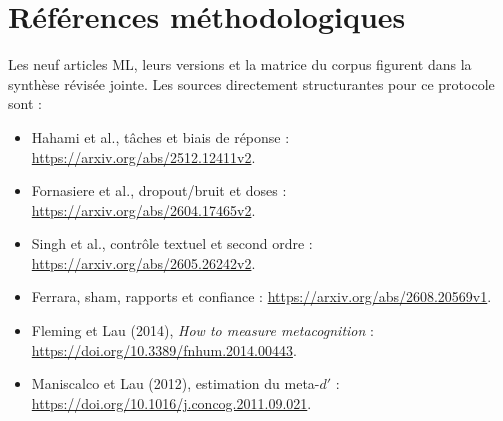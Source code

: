 \documentclass[10pt,a4paper]{article}
\begin{document}
\section*{Références méthodologiques}
\small\setlength{\parskip}{3pt}
Les neuf articles ML, leurs versions et la matrice du corpus figurent dans la synthèse révisée jointe. Les sources directement structurantes pour ce protocole sont :
\begin{itemize}
\item Hahami et al., tâches et biais de réponse : \url{https://arxiv.org/abs/2512.12411v2}.
\item Fornasiere et al., dropout/bruit et doses : \url{https://arxiv.org/abs/2604.17465v2}.
\item Singh et al., contrôle textuel et second ordre : \url{https://arxiv.org/abs/2605.26242v2}.
\item Ferrara, sham, rapports et confiance : \url{https://arxiv.org/abs/2608.20569v1}.
\item Fleming et Lau (2014), \emph{How to measure metacognition} : \url{https://doi.org/10.3389/fnhum.2014.00443}.
\item Maniscalco et Lau (2012), estimation du meta-$d'$ : \url{https://doi.org/10.1016/j.concog.2011.09.021}.
\end{itemize}
\end{document}
